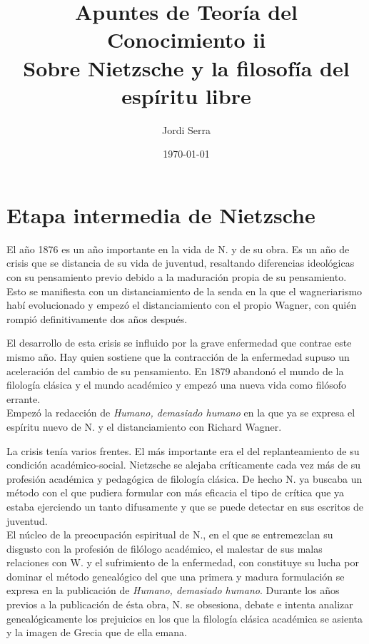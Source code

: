 \documentclass[a4paper, 10pt, twocolumn, spanish]{article}
\author{Jordi Serra}
\date{\today}
\title{Apuntes de Teoría del Conocimiento ii\\\medskip
\large Sobre Nietzsche y la filosofía del espíritu libre}
\begin{document}
\maketitle
\tableofcontents


\section{Etapa intermedia de Nietzsche}
\label{sec:org81b02b6}
El año 1876 es un año importante en la vida de N. y de su obra. Es un
año de crisis que se distancia de su vida de juventud, resaltando
diferencias ideológicas con su pensamiento previo debido a la
maduración propia de su pensamiento. Esto se manifiesta con un
distanciamiento de la senda en la que el wagneriarismo habí
evolucionado y empezó el distanciamiento con el propio Wagner, con
quién rompió definitivamente dos años después.

El desarrollo de esta crisis se influido por la grave enfermedad que
contrae este mismo año. Hay quien sostiene que la contracción de la
enfermedad supuso un aceleración del cambio de su pensamiento. En 1879
abandonó el mundo de la filología clásica y el mundo académico y
empezó una nueva vida como filósofo errante.\\[0pt]

Empezó la redacción de \emph{Humano, demasiado humano} en la que ya se
expresa el espíritu nuevo de N. y el distanciamiento con Richard
Wagner.

La crisis tenía varios frentes. El más importante era el del
replanteamiento de su condición académico-social. Nietzsche se alejaba
críticamente cada vez más de su profesión académica y pedagógica de
filología clásica. De hecho N. ya buscaba un método con el que pudiera
formular con más eficacia el tipo de crítica que ya estaba ejerciendo
un tanto difusamente y que se puede detectar en sus escritos de
juventud.\\[0pt]

El núcleo de la preocupación espiritual de N., en el que se
entremezclan su disgusto con la profesión de filólogo académico, el
malestar de sus malas relaciones con W. y el sufrimiento de la
enfermedad, con constituye su lucha por dominar el método genealógico
del que una primera y madura formulación se expresa en la publicación
de \emph{Humano, demasiado humano}. Durante los años previos a la
publicación de ésta obra, N. se obsesiona, debate e intenta analizar
genealógicamente los prejuicios en los que la filología clásica
académica se asienta y la imagen de Grecia que de ella emana.\\[0pt]
\end{document}
